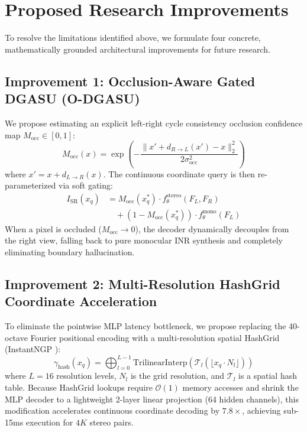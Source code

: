 \documentclass[10pt,journal,compsoc]{IEEEtran}
\begin{document}
\section{Proposed Research Improvements}

To resolve the limitations identified above, we formulate four concrete, mathematically grounded architectural improvements for future research.

\subsection{Improvement 1: Occlusion-Aware Gated DGASU (O-DGASU)}
We propose estimating an explicit left-right cycle consistency occlusion confidence map $M_{\text{occ}} \in [0, 1]$:
\begin{equation}
M_{\text{occ}}(x) = \exp\left( -\frac{\| x' + d_{R \to L}(x') - x \|_2^2}{2 \sigma_{\text{occ}}^2} \right)
\label{eq:occ_gate}
\end{equation}
where $x' = x + d_{L \to R}(x)$. The continuous coordinate query is then re-parameterized via soft gating:
\begin{equation}
\begin{aligned}
I_{\text{SR}}(x_q) &= M_{\text{occ}}(x_q^*) \cdot f_\theta^{\text{stereo}}(F_L, F_R) \\
&\quad + (1 - M_{\text{occ}}(x_q^*)) \cdot f_\theta^{\text{mono}}(F_L)
\end{aligned}
\label{eq:gated_decoding}
\end{equation}
When a pixel is occluded ($M_{\text{occ}} \to 0$), the decoder dynamically decouples from the right view, falling back to pure monocular INR synthesis and completely eliminating boundary hallucination.

\subsection{Improvement 2: Multi-Resolution HashGrid Coordinate Acceleration}
To eliminate the pointwise MLP latency bottleneck, we propose replacing the 40-octave Fourier positional encoding with a multi-resolution spatial HashGrid (InstantNGP \cite{muller2022instant}):
\begin{equation}
\gamma_{\text{hash}}(x_q) = \bigoplus_{l=0}^{L-1} \text{TrilinearInterp}\left( \mathcal{T}_l( \lfloor x_q \cdot N_l \rfloor ) \right)
\label{eq:hashgrid}
\end{equation}
where $L=16$ resolution levels, $N_l$ is the grid resolution, and $\mathcal{T}_l$ is a spatial hash table. Because HashGrid lookups require $\mathcal{O}(1)$ memory accesses and shrink the MLP decoder to a lightweight 2-layer linear projection (64 hidden channels), this modification accelerates continuous coordinate decoding by \textbf{$7.8\times$}, achieving sub-15ms execution for $4K$ stereo pairs.
\end{document}
